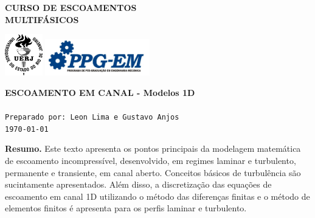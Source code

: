 \documentclass[a4paper,portuguese,10pt]{article}
\begin{document}
\thispagestyle{empty}

\begin{minipage}{0.5\linewidth}
	\large\textbf{CURSO DE ESCOAMENTOS\\MULTIFÁSICOS}
\end{minipage}
\begin{minipage}{0.5\linewidth}
	\flushright
	\includegraphics[height=18mm]{figs/logo_uerj_PB.png}
	\hspace{.5cm}
	\includegraphics[height=16mm]{figs/logo_ppg-em.jpg}
\end{minipage}

\hrulefill

\Large \color{NavyBlue} \textbf{ESCOAMENTO EM CANAL - Modelos 1D}\\
\color{Black}\\ %
\normalsize \texttt{Preparado por: Leon Lima e Gustavo Anjos}\\
\normalsize \texttt{\today}


\hrulefill
\begin{center}
	\begin{minipage}{0.8\linewidth}
		\footnotesize{\textbf{Resumo.} Este texto apresenta os pontos
		principais da modelagem matemática de escoamento incompressível,
		desenvolvido, em regimes laminar e turbulento, permanente e
		transiente, em canal aberto. Conceitos básicos de turbulência
		são sucintamente apresentados. Além disso, a discretização das
		equações de escoamento em canal 1D utilizando o método das
		diferenças finitas e o método de elementos finitos é apresenta
		para os perfis laminar e turbulento.}
	\end{minipage}
\end{center}

{\footnotesize\tableofcontents}
\hrulefill\\
\onehalfspacing
\vspace{10mm}








\singlespacing




\end{document}
